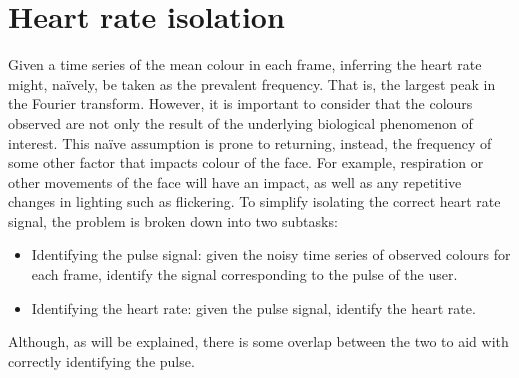 \section{Heart rate isolation}
Given a time series of the mean colour in each frame, inferring the heart rate might, naïvely, be taken as the prevalent frequency. That is, the largest peak in the Fourier transform. 
However, it is important to consider that the colours observed are not only the result of the underlying biological phenomenon of interest. This naïve assumption is prone to returning, instead,
 the frequency of some other factor that impacts colour of the face. For example, respiration or other movements of the face will have an impact, as well as any repetitive changes in lighting such as flickering. 
To simplify isolating the correct heart rate signal, the problem is broken down into two subtasks:
\begin{itemize}
    \item Identifying the pulse signal: given the noisy time series of observed colours for each frame, identify the signal corresponding to the pulse of the user.
    \item Identifying the heart rate: given the pulse signal, identify the heart rate.
\end{itemize}
Although, as will be explained, there is some overlap between the two to aid with correctly identifying the pulse.

